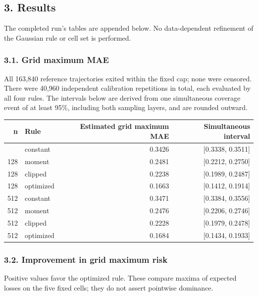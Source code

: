 \subsection{3. Results}\label{confirmation-results}

The completed run's tables are appended below. No data-dependent
refinement of the Gaussian rule or cell set is performed.

\subsubsection{3.1. Grid maximum MAE}\label{confirmation-grid-maximum-mae}

All 163,840 reference trajectories exited within the fixed cap; none
were censored. There were 40,960 independent calibration repetitions in
total, each evaluated by all four rules. The intervals below are derived
from one simultaneous coverage event of at least 95\%, including both
sampling layers, and are rounded outward.

{\def\LTcaptype{table} %
\begin{longtable}[]{@{}rlrr@{}}
\toprule\noalign{}
n & Rule & Estimated grid maximum MAE & Simultaneous interval \\
\midrule\noalign{}
\endhead
\bottomrule\noalign{}
\endlastfoot
128 & constant & 0.3426 & {[}0.3338, 0.3511{]} \\
128 & moment & 0.2481 & {[}0.2212, 0.2750{]} \\
128 & clipped & 0.2238 & {[}0.1989, 0.2487{]} \\
128 & optimized & 0.1663 & {[}0.1412, 0.1914{]} \\
512 & constant & 0.3471 & {[}0.3384, 0.3556{]} \\
512 & moment & 0.2476 & {[}0.2206, 0.2746{]} \\
512 & clipped & 0.2228 & {[}0.1979, 0.2478{]} \\
512 & optimized & 0.1684 & {[}0.1434, 0.1933{]} \\
\end{longtable}
}

\subsubsection{3.2. Improvement in grid maximum
risk}\label{confirmation-improvement-in-grid-maximum-risk}

Positive values favor the optimized rule. These compare maxima of
expected losses on the five fixed cells; they do not assert pointwise
dominance.


